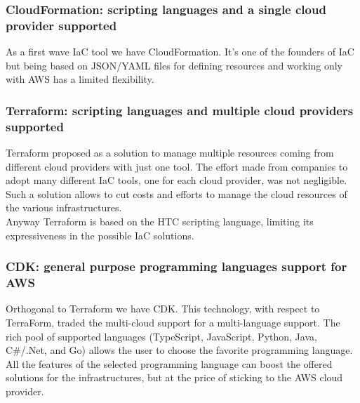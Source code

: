 \subsubsection{CloudFormation: scripting languages and a single cloud provider supported}
As a first wave IaC tool we have CloudFormation. 
It's one of the founders of IaC but being based on JSON/YAML files for defining resources and working only with AWS has a limited flexibility.\\

\subsubsection{Terraform: scripting languages and multiple cloud providers supported}
Terraform proposed as a solution to manage multiple resources coming from different cloud providers with just one tool.
The effort made from companies to adopt many different IaC tools, one for each cloud provider, was not negligible.
Such a solution allows to cut costs and efforts to manage the cloud resources of the various infrastructures.\\
Anyway Terraform is based on the HTC scripting language, limiting its expressiveness in the possible IaC solutions.

\subsubsection{CDK: general purpose programming languages support for AWS}
Orthogonal to Terraform we have CDK.
This technology, with respect to TerraForm, traded the multi-cloud support for a multi-language support.
The rich pool of supported languages (TypeScript, JavaScript, Python, Java, C\#/.Net, and Go) allows the user to choose the favorite programming language.
All the features of the selected programming language can boost the offered solutions for the infrastructures, but at the price of sticking to the AWS cloud provider.

